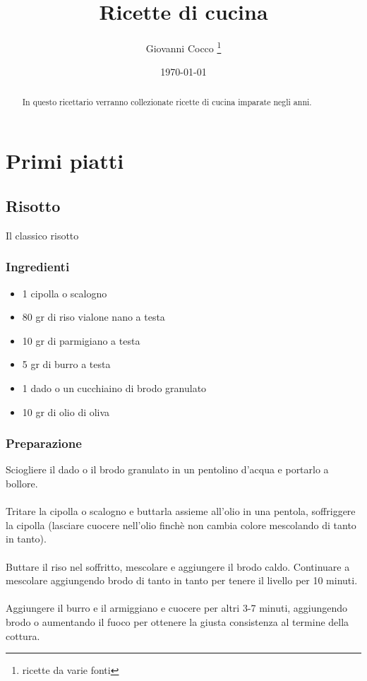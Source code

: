 \documentclass[12pt, a4paper]{article}
\title{Ricette di cucina}
\author{Giovanni Cocco \thanks{ricette da varie fonti}}
\date{\monthyeardate\today}
\begin{document}
\begin{titlepage}
\maketitle
\thispagestyle{empty}
\end{titlepage}

\begin{abstract}
In questo ricettario verranno collezionate ricette di cucina imparate negli anni.
\end{abstract}
\clearpage

\tableofcontents{}
\clearpage

\section{Primi piatti}

\subsection{Risotto}

Il classico risotto

\subsubsection{Ingredienti}
\begin{itemize}
\item 1 cipolla o scalogno
\item 80 gr di riso vialone nano a testa
\item 10 gr di parmigiano a testa
\item 5 gr di burro a testa
\item 1 dado o un cucchiaino di brodo granulato
\item 10 gr di olio di oliva
\end{itemize}

\subsubsection{Preparazione}
	Sciogliere il dado o il brodo granulato in un pentolino d'acqua e
	portarlo a bollore.\\\\
	Tritare la cipolla o scalogno e buttarla assieme all'olio in una 
	pentola, soffriggere la cipolla (lasciare cuocere nell'olio finchè 
	non cambia colore mescolando di tanto in tanto).\\\\
	Buttare il riso nel soffritto, mescolare e aggiungere il brodo caldo.
	Continuare a mescolare aggiungendo brodo di tanto in tanto per 
	tenere il livello per 10 minuti.\\\\
	Aggiungere il burro e il armiggiano e cuocere per altri 3-7 minuti,
	aggiungendo brodo o aumentando il fuoco per ottenere la giusta 
	consistenza al termine della cottura.
\end{document}
